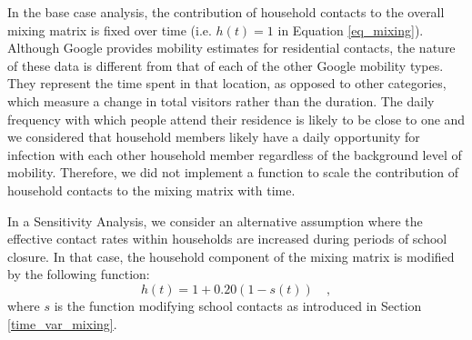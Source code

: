 In the base case analysis, the contribution of household contacts to the overall mixing matrix is fixed over time 
(i.e. $h(t) = 1$ in Equation \ref{eq_mixing}). Although Google provides mobility 
estimates for residential contacts, the nature of these data is different from that of each of the other Google mobility 
types. They represent the time spent in that location, as opposed to other categories, which measure a change in total visitors 
rather than the duration. The daily frequency with which people attend their residence is likely to be close to one and we 
considered that household members likely have a daily opportunity for infection with each other household member regardless of
the background level of mobility. Therefore, we did not implement a function to scale the contribution of household contacts 
to the mixing matrix with time.

In a Sensitivity Analysis, we consider an alternative assumption where the effective contact rates within households are increased during
periods of school closure. In that case, the household component of the mixing matrix is modified by the following function:
$$ h(t) = 1 + 0.20(1 - s(t)) \quad ,$$ 
where $s$ is the function modifying school contacts as introduced in Section \ref{time_var_mixing}.

